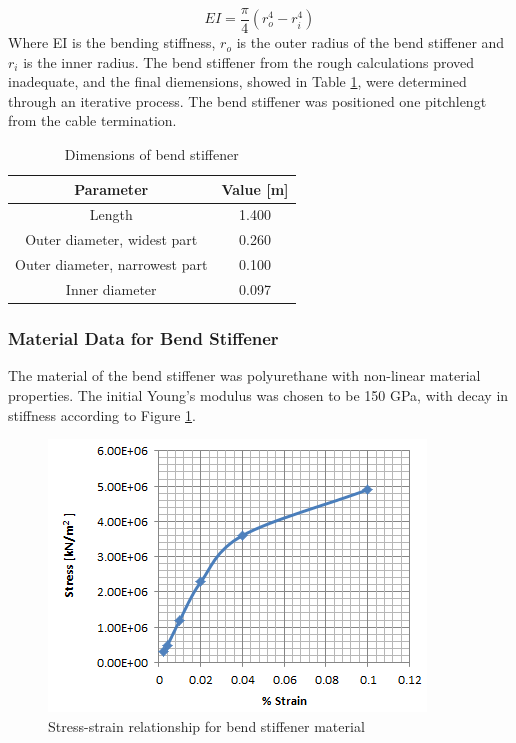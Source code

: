  \begin{equation}
  EI = \frac{\pi}{4}(r_o^4 - r_i^4) 
\end{equation}
 Where EI is the bending stiffness, $r_o$ is the outer radius of the bend stiffener and $r_i$ is the inner radius.\newline 
\newline 
The bend stiffener from the rough calculations proved inadequate, and the final diemensions, showed in Table \ref{table:benddim},  were determined through an iterative process. The bend stiffener was positioned one pitchlengt from the cable termination.
 \begin{table} [H]
\centering
\begin{tabular}{ |c|c|}
\hline
Parameter & Value [m] \\
 \hline
 \hline
 
 Length & 1.400 \\
 
Outer diameter, widest part & 0.260\\

Outer diameter, narrowest part & 0.100\\

 Inner diameter & 0.097 \\
 

 \hline
\end{tabular}
\caption{Dimensions of bend stiffener}
\label{table:benddim}
\end{table}
\subsubsection{Material Data for Bend Stiffener}
The material of the bend stiffener was polyurethane with non-linear material properties. The initial Young's modulus was chosen to be 150 GPa, with decay in stiffness according to  Figure \ref{fig:matbend}.
\begin{figure}[H]
\centering
\includegraphics[scale=0.8]{figures/matbend}
\caption[$\; \:$ Stress-strain relationship for bend stiffener material]{Stress-strain relationship for bend stiffener material}
 \label{fig:matbend}
\end{figure}

